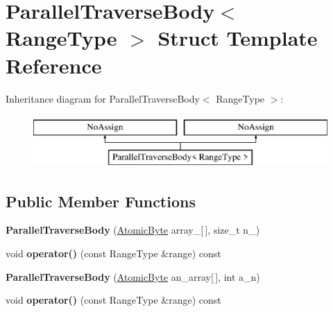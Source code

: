 \hypertarget{structParallelTraverseBody}{}\section{Parallel\+Traverse\+Body$<$ Range\+Type $>$ Struct Template Reference}
\label{structParallelTraverseBody}
Inheritance diagram for Parallel\+Traverse\+Body$<$ Range\+Type $>$\+:\begin{figure}[H]
\begin{center}
\leavevmode
\includegraphics[height=2.000000cm]{structParallelTraverseBody}
\end{center}
\end{figure}
\subsection*{Public Member Functions}
\begin{DoxyCompactItemize}
\item 
\hypertarget{structParallelTraverseBody_afb6c8fb00d4d1e56fb9f76ca5a9fc6e4}{}{\bfseries Parallel\+Traverse\+Body} (\hyperlink{structtbb_1_1atomic}{Atomic\+Byte} array\+\_\+\mbox{[}$\,$\mbox{]}, size\+\_\+t n\+\_\+)\label{structParallelTraverseBody_afb6c8fb00d4d1e56fb9f76ca5a9fc6e4}

\item 
\hypertarget{structParallelTraverseBody_a8e1534688af395150c613ed53b92c9f8}{}void {\bfseries operator()} (const Range\+Type \&range) const \label{structParallelTraverseBody_a8e1534688af395150c613ed53b92c9f8}

\item 
\hypertarget{structParallelTraverseBody_a5601ecbb0cfb466edf81513382ee8db8}{}{\bfseries Parallel\+Traverse\+Body} (\hyperlink{structtbb_1_1atomic}{Atomic\+Byte} an\+\_\+array\mbox{[}$\,$\mbox{]}, int a\+\_\+n)\label{structParallelTraverseBody_a5601ecbb0cfb466edf81513382ee8db8}

\item 
\hypertarget{structParallelTraverseBody_a8e1534688af395150c613ed53b92c9f8}{}void {\bfseries operator()} (const Range\+Type \&range) const \label{structParallelTraverseBody_a8e1534688af395150c613ed53b92c9f8}

\end{DoxyCompactItemize}
